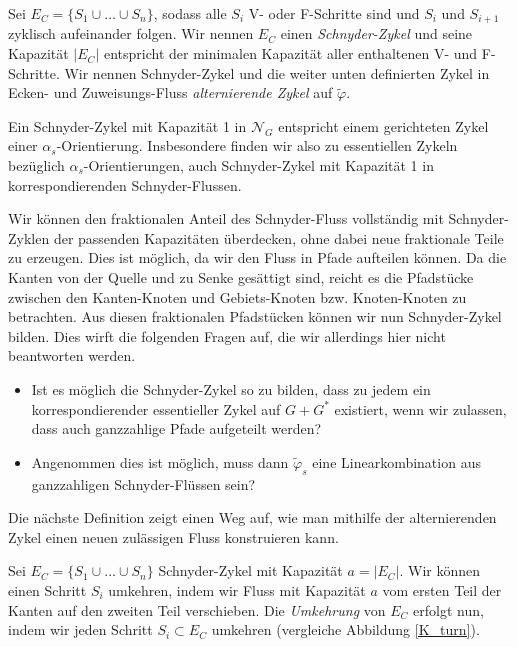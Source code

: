 \begin{definition}
Sei $E_C = \{S_1\cup \ldots \cup S_n\}$, sodass alle $S_i$ V- oder F-Schritte sind und $S_i$ und $S_{i+1}$ zyklisch aufeinander folgen. Wir nennen $E_C$ einen \textit{Schnyder-Zykel} und seine Kapazität $|E_C|$ entspricht der minimalen Kapazität aller enthaltenen V- und F-Schritte. Wir nennen Schnyder-Zykel und die weiter unten definierten Zykel in Ecken- und Zuweisungs-Fluss \textit{alternierende Zykel} auf $\tilde{\varphi}$.
\end{definition}

Ein Schnyder-Zykel mit Kapazität 1 in $\mathcal{N}_G$ entspricht einem gerichteten Zykel einer $\alpha_s$-Orientierung. Insbesondere finden wir also zu essentiellen Zykeln bezüglich $\alpha_s$-Orientierungen, auch Schnyder-Zykel mit Kapazität 1 in korrespondierenden Schnyder-Flussen.

\begin{remark}
Wir können den fraktionalen Anteil des Schnyder-Fluss vollständig mit Schnyder-Zyklen der passenden Kapazitäten überdecken, ohne dabei neue fraktionale Teile zu erzeugen. Dies ist möglich, da wir den Fluss in Pfade aufteilen können. Da die Kanten von der Quelle und zu Senke gesättigt sind, reicht es die Pfadstücke zwischen den Kanten-Knoten und Gebiets-Knoten bzw. Knoten-Knoten zu betrachten. Aus diesen fraktionalen Pfadstücken können wir nun Schnyder-Zykel bilden. Dies wirft die folgenden Fragen auf, die wir allerdings hier nicht beantworten werden.

\begin{itemize}
\item Ist es möglich die Schnyder-Zykel so zu bilden, dass zu jedem ein korrespondierender essentieller Zykel auf $G+G^*$ existiert, wenn wir zulassen, dass auch ganzzahlige Pfade aufgeteilt werden?
\item Angenommen dies ist möglich, muss dann $\tilde{\varphi}_s$ eine Linearkombination aus ganzzahligen Schnyder-Flüssen sein?
\end{itemize}
\end{remark}

Die nächste Definition zeigt einen Weg auf, wie man mithilfe der alternierenden Zykel einen neuen zulässigen Fluss konstruieren kann.

\begin{definition}
Sei $E_C = \{S_1\cup \ldots \cup S_n\}$ Schnyder-Zykel mit Kapazität $a=|E_C|$. Wir können einen Schritt $S_i$ umkehren, indem wir Fluss mit Kapazität $a$ vom ersten Teil der Kanten auf den zweiten Teil verschieben. Die \textit{Umkehrung} von $E_C$ erfolgt nun, indem wir jeden Schritt $S_i \subset E_C$ umkehren (vergleiche Abbildung \ref{K_turn}).
\end{definition}

